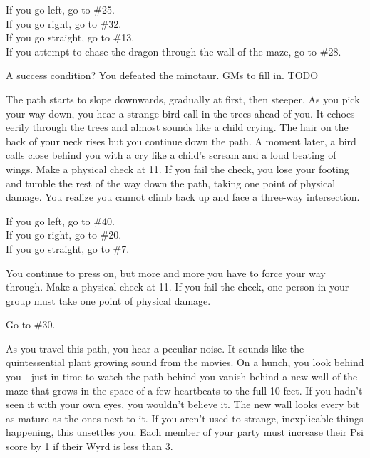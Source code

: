 \documentclass[green]{gl2018}
\begin{document}
\begin{LARGE}
\begin{location}{15}
\begin{fromhere}
   If you go left, go to \#25.\\
 If you go right, go to \#32.\\ 
If you go straight, go to \#13.\\
If you attempt to chase the dragon through the wall of the maze, go to \#28.
\end{fromhere}
\end{location}
\begin{location}{16}
A success condition?  You defeated the minotaur.  GMs to fill in. TODO
\end{location}
\begin{location}{17}
The path starts to slope downwards, gradually at first, then steeper.  As you pick your way down, you hear a strange bird call in the trees ahead of you.  It echoes eerily through the trees and almost sounds like a child crying.  The hair on the back of your neck rises but you continue down the path.  A moment later, a bird calls close behind you with a cry like a child’s scream and a loud beating of wings.  Make a physical check at 11.  If you fail the check, you lose your footing and tumble the rest of the way down the path, taking one point of physical damage.  You realize you cannot climb back up and face a three-way intersection.  
\begin{fromhere}
If you go left, go to \#40.\\
  If you go right, go to \#20.\\
  If you go straight, go to \#7.\\
\end{fromhere}
\end{location}
\begin{location}{18}
You continue to press on, but more and more you have to force your way through. Make a physical check at 11. If you fail the check, one person in your group must take one point of physical damage. 
\begin{fromhere}Go to \#30.\end{fromhere}
\end{location}
\begin{location}{19}
As you travel this path, you hear a peculiar noise. It sounds like the quintessential plant growing sound from the movies. On a hunch, you look behind you - just in time to watch the path behind you vanish behind a new wall of the maze that grows in the space of a few heartbeats to the full 10 feet. If you hadn't seen it with your own eyes, you wouldn't believe it. The new wall looks every bit as mature as the ones next to it. If you aren't used to strange, inexplicable things happening, this unsettles you.  Each member of your party must increase their Psi score by 1 if their Wyrd is less than 3.

\end{location}
\end{LARGE}
\end{document}
